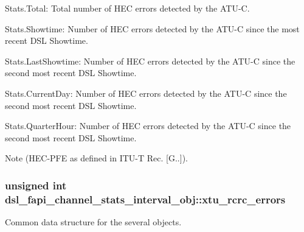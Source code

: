 \begin{DoxyItemize}
\item Stats.\-Total\-: Total number of H\-E\-C errors detected by the A\-T\-U-\/\-C.
\item Stats.\-Showtime\-: Number of H\-E\-C errors detected by the A\-T\-U-\/\-C since the most recent D\-S\-L Showtime.
\item Stats.\-Last\-Showtime\-: Number of H\-E\-C errors detected by the A\-T\-U-\/\-C since the second most recent D\-S\-L Showtime.
\item Stats.\-Current\-Day\-: Number of H\-E\-C errors detected by the A\-T\-U-\/\-C since the second most recent D\-S\-L Showtime.
\item Stats.\-Quarter\-Hour\-: Number of H\-E\-C errors detected by the A\-T\-U-\/\-C since the second most recent D\-S\-L Showtime. \begin{DoxyNote}{Note}
(H\-E\-C-\/\-P\-F\-E as defined in I\-T\-U-\/\-T Rec. \mbox{[}G..\mbox{]}). 
\end{DoxyNote}

\end{DoxyItemize}\hypertarget{structdsl__fapi__channel__stats__interval__obj_a87fec32ef4830259193a62bbe6639eaf}{
\subsubsection[{xtu\-\_\-rcrc\-\_\-errors}]{\setlength{\rightskip}{0pt plus 5cm}unsigned int dsl\-\_\-fapi\-\_\-channel\-\_\-stats\-\_\-interval\-\_\-obj\-::xtu\-\_\-rcrc\-\_\-errors}}\label{structdsl__fapi__channel__stats__interval__obj_a87fec32ef4830259193a62bbe6639eaf}
Common data structure for the several objects.
